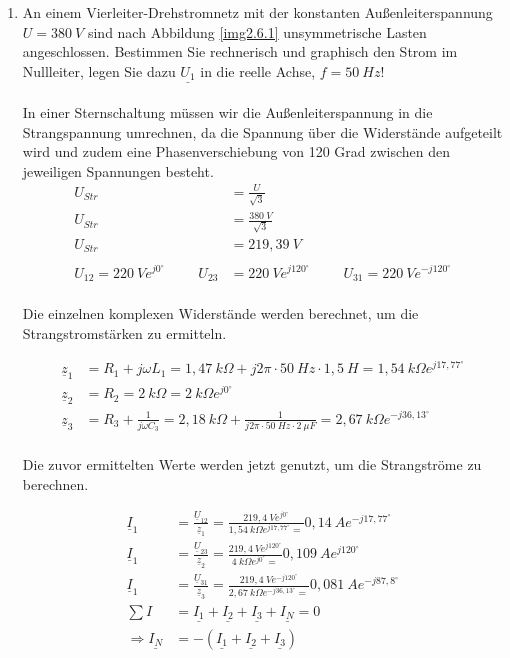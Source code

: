 \begin{enumerate}[label=\alph*)]
  \item An einem Vierleiter-Drehstromnetz mit der konstanten Außenleiterspannung $U = 380\ V$ sind nach Abbildung \ref{img2.6.1} unsymmetrische Lasten angeschlossen. Bestimmen Sie rechnerisch und graphisch den Strom im Nullleiter, legen Sie dazu $\underline{U_1}$ in die reelle Achse, $f = 50\ Hz$!
	\\ \ \\
	In einer Sternschaltung müssen wir die Außenleiterspannung in die Strangspannung umrechnen, da die Spannung über die Widerstände aufgeteilt wird und zudem eine Phasenverschiebung von 120 Grad zwischen den jeweiligen Spannungen besteht.\\
	\begin{align*}
		U_{Str} &= \frac{U}{\sqrt{3}} \\
		U_{Str} &= \frac{380\ V}{\sqrt{3}}\\
		U_{Str} &= 219,39\ V\\ \ \\
		U_{12}=220\ Ve^{j0^\circ} \hspace{1cm}
		U_{23}&=220\ Ve^{j120^\circ} \hspace{1cm}
		U_{31}=220\ Ve^{-j120^\circ}\\
	\end{align*}
		
	Die einzelnen komplexen Widerstände werden berechnet, um die Strangstromstärken zu ermitteln.
	
	\begin{align*}
		\underline{z}_{1} &= R_{1} + j\omega L_{1} = 1,47\ k\Omega + j2\pi\cdot 50\ Hz\cdot1,5\ H = 1,54\ k\Omega e^{j17,77^\circ}\\
		\underline{z}_{2} &= R_{2} = 2\ k\Omega = 2\ k\Omega e^{j0^\circ}\\
		\underline{z}_{3} &= R_{3} + \frac{1}{j\omega C_{3}} = 2,18\ k\Omega + \frac{1}{j2\pi\cdot 50\ Hz\cdot2\ \mu F} = 2,67\ k\Omega e^{-j36,13^\circ}\\
	\end{align*}
	
	Die zuvor ermittelten Werte werden jetzt genutzt, um die Strangströme zu berechnen.
	
	\begin{align*}
		\underline{I}_{1} &= \frac{\underline{U}_{12}}{\underline{z}_{1}} = \frac{219,4\ Ve^{j0^\circ}}{1,54\ k\Omega e^{j17,77^\circ}=}0,14\ Ae^{-j17,77^\circ}\\		\underline{I}_{1} &= \frac{\underline{U}_{23}}{\underline{z}_{2}} = \frac{219,4\ Ve^{j120^\circ}}{4\ k\Omega e^{j0^\circ}=}0,109\ Ae^{j120^\circ}\\		\underline{I}_{1} &= \frac{\underline{U}_{31}}{\underline{z}_{3}} = \frac{219,4\ Ve^{-j120^\circ}}{2,67\ k\Omega e^{-j36,13^\circ}=}0,081\ Ae^{-j87,8^\circ}\\
		\sum I &= \underline{I_1}+\underline{I_2}+\underline{I_3}+\underline{I_N}=0\\
		\Rightarrow \underline{I_N}&=-(\underline{I_1}+\underline{I_2}+\underline{I_3})
	\end{align*}
	

\end{enumerate}
